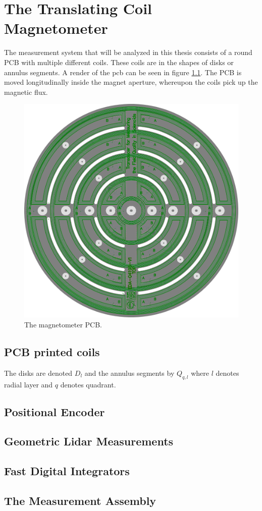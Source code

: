 \chapter{The Translating Coil Magnetometer}
The measurement system that will be analyzed in this thesis consists
of a round PCB with multiple different coils. These coils are in the shapes
of disks or annulus segments. A render of the pcb can be seen in figure
\ref{fig:pcb}. The PCB is moved longitudinally inside the magnet aperture,
whereupon the coils pick up the magnetic flux.

\begin{figure}[h]
    \centering
    \includegraphics[width=0.5\linewidth]{figs/pcb}
    \caption{The magnetometer PCB.}
    \label{fig:pcb}
\end{figure}

\section{PCB printed coils}
The disks are denoted $D_l$ and the 
annulus segments by $Q_{q, l}$ where $l$ denotes radial layer and 
$q$ denotes quadrant.
\section{Positional Encoder}
\section{Geometric Lidar Measurements}
\section{Fast Digital Integrators}
\section{The Measurement Assembly}